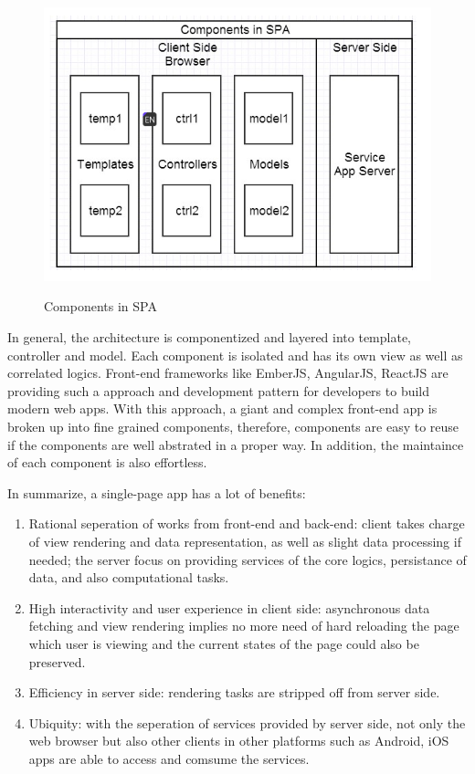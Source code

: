 \begin{figure}[!htbp]
  \caption{Components in SPA}
  \centering
    \includegraphics[width=1\textwidth]{Figures/3_4.png}
  \label{fig:3.4}
\end{figure}

In general, the architecture is componentized and layered into template, controller and model. Each component is isolated and has its own view as well as correlated logics. Front-end frameworks like EmberJS, AngularJS, ReactJS are providing such a approach and development pattern for developers to build modern web apps. With this approach, a giant and complex front-end app is broken up into fine grained components, therefore, components are easy to reuse if the components are well abstrated in a proper way. In addition, the maintaince of each component is also effortless.

In summarize, a single-page app has a lot of benefits:

\begin{enumerate}
\item
Rational seperation of works from front-end and back-end: client takes charge of view rendering and data representation, as well as slight data processing if needed; the server focus on providing services of the core logics, persistance of data, and also computational tasks.
\item
High interactivity and user experience in client side: asynchronous data fetching and view rendering implies no more need of hard reloading the page which user is viewing and the current states of the page could also be preserved.
\item
Efficiency in server side: rendering tasks are stripped off from server side.
\item
Ubiquity: with the seperation of services provided by server side, not only the web browser but also other clients in other platforms such as Android, iOS apps are able to access and comsume the services.
\end{enumerate}

